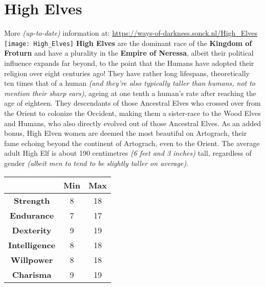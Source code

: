 \documentclass[openany,10pt,a4paper]{book}
\begin{document}
\section{High Elves}
More \textit{(up-to-date)} information at: \url{https://ways-of-darkness.sonck.nl/High_Elves}\newline
\texttt{[image: High\_Elves]}\newline
\textbf{High Elves} are the dominant race of the \textbf{Kingdom of Froturn} and have a plurality in the \textbf{Empire of Neressa}, albeit their political influence expands far beyond, to the point that the Humans have adopted their religion over eight centuries ago! They have rather long lifespans, theoretically ten times that of a human \textit{(and they're also typically taller than humans, not to mention their sharp ears)}, ageing at one tenth a human's rate after reaching the age of eighteen. They descendants of those Ancestral Elves who crossed over from the Orient to colonize the Occident, making them a sister-race to the Wood Elves and Humans, who also directly evolved out of those Ancestral Elves. As an added bonus, High Elven women are deemed the most beautiful on Artograch, their fame echoing beyond the continent of Artograch, even to the Orient. The average adult High Elf is about 190 centimetres \textit{(6 feet and 3 inches)} tall, regardless of gender \textit{(albeit men to tend to be slightly taller on average)}.\newline
\begin{tabular}{|c|c|c|}
\hline
 & \textbf{Min} & \textbf{Max} \\ \hline
\textbf{Strength} & 8 & 18 \\ \hline
\textbf{Endurance} & 7 & 17 \\ \hline
\textbf{Dexterity} & 9 & 19 \\ \hline
\textbf{Intelligence} & 8 & 18 \\ \hline
\textbf{Willpower} & 8 & 18 \\ \hline
\textbf{Charisma} & 9 & 19 \\ \hline
\end{tabular}\newline
{} \newpage
\end{document}
